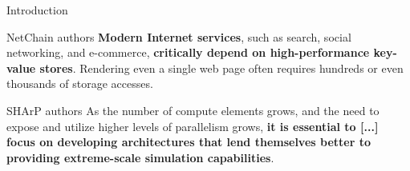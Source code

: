 \begin{frame}[fragile]{Introduction}

    \vspace{10mm}

    \begin{aquote}{NetChain\footnotemark{} authors}
        \textbf{Modern Internet services}, such as search, social networking, and e-commerce, \textbf{critically depend on high-performance key-value stores}. Rendering even a single web page often requires hundreds or even thousands of storage accesses.
    \end{aquote}

    \vspace{7mm}

    \begin{aquote}{SHArP\footnotemark{} authors}
        As the number of compute elements grows, and the need to expose and utilize higher levels of parallelism grows, \textbf{it is essential to [...] focus on developing architectures that lend themselves better to providing extreme-scale simulation capabilities}.
    \end{aquote}

    \vspace{8mm}

    \setcounter{footnote}{1}
\end{frame}

